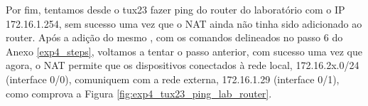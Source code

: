 Por fim, tentamos desde o tux23 fazer ping do router do laboratório com o IP 172.16.1.254, sem sucesso uma vez que o NAT ainda não tinha sido adicionado ao router. 
Após a adição do mesmo \cite{cisco_nat}, com os comandos delineados no passo 6 do Anexo \ref{exp4_steps}, voltamos a tentar o passo anterior, com sucesso uma vez que agora, o NAT permite que os dispositivos conectados à rede local, 172.16.2x.0/24 (interface 0/0), comuniquem com a rede externa, 172.16.1.29 (interface 0/1), como comprova a Figura \ref{fig:exp4_tux23_ping_lab_router}.
